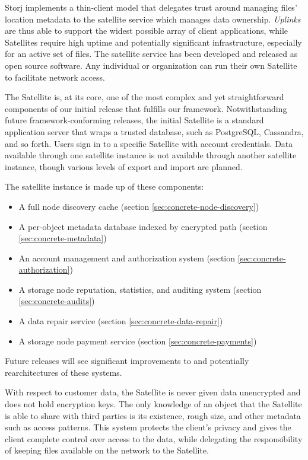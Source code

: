 \documentclass[8pt,fleqn,openany]{book}
\begin{document}
Storj implements a thin-client model that delegates trust around managing
files' location metadata to the satellite service which manages data
ownership. {\em Uplinks}
are thus able to support the widest possible array of client applications, while
Satellites require high uptime and potentially significant infrastructure,
especially for an active set of files.
The satellite service has been developed and released as open source software.
Any individual or organization can run their own Satellite to facilitate
network access.

The Satellite is, at its core, one of the most complex and yet
straightforward components of our initial release that fulfills our framework.
Notwithstanding future framework-conforming releases, the initial Satellite
is a standard application server that wraps a trusted database, such as
PostgreSQL, Cassandra, and so forth. Users sign in to a specific
Satellite with account credentials.
Data available through one satellite instance is
not available through another satellite instance, though various levels of
export and import are planned.

The satellite instance is made up of these components:
\begin{itemize}
\item A full node discovery cache (section \ref{sec:concrete-node-discovery})
\item A per-object metadata database indexed by encrypted path
  (section \ref{sec:concrete-metadata})
\item An account management and authorization system
  (section \ref{sec:concrete-authorization})
\item A storage node reputation, statistics, and auditing system
  (section \ref{sec:concrete-audits})
\item A data repair service (section \ref{sec:concrete-data-repair})
\item A storage node payment service (section \ref{sec:concrete-payments})
\end{itemize}

Future releases will see significant improvements to and potentially
rearchitectures of these systems.

With respect to customer data, the Satellite is
never given data unencrypted and does not hold encryption keys.
The only knowledge of an object that the Satellite is able to share with
third parties is its existence, rough size, and other metadata such as access
patterns.
This system protects the client's privacy and gives the client complete
control over access to the data,
while delegating the responsibility of keeping files available on the network
to the Satellite.
\end{document}
